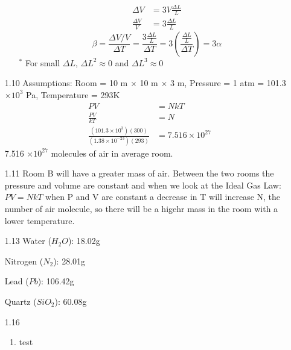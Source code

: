 \documentclass{article}
\begin{document}
\begin{enumerate}
\begin{enumerate}
\begin{align*}
                \Delta V &= 3V \frac{\Delta L}{L} \\
                \frac{\Delta V}{V} &= 3 \frac{\Delta L}{L}
            \end{align*}
            \begin{equation*}
                \beta = \frac{\Delta V / V}{\Delta T} = \frac{3 \frac{\Delta L}{L}}{\Delta T} = 3 \left(\frac{\frac{\Delta L}{L}}{\Delta T} \right) = 3 \alpha
            \end{equation*}
            \(^{\ast}\) For small \(\Delta L\), \(\Delta L^2 \approx 0\) and \(\Delta L^3 \approx 0\)
    \end{enumerate}
    \vspace{0.1in}
    \item [1.10]
    Assumptions: Room = 10 m \(\times\) 10 m \(\times\) 3 m, Pressure = 1 atm = 101.3 \(\times 10^3\) Pa, Temperature = 293\degree K
       \begin{align*}
            PV &= NkT \\
            \frac{PV}{kT} &= N \\
            \frac{(101.3 \times 10^3)(300)}{(1.38 \times 10^{-23})(293)} &= 7.516 \times 10^{27}
        \end{align*}
        7.516 \(\times 10^{27}\) molecules of air in average room.
    \vspace{0.1in}
    \item [1.11]
    Room B will have a greater mass of air. Between the two rooms the pressure and volume are constant and when we look at the Ideal Gas Law: \(PV = NkT\) when P and V are constant a decrease in T will increase N, the number of air molecule, so there will be a higehr mass in the room with a lower temperature.
    \vspace{0.1in}
    \item [1.13]
    Water (\(H_2 O\)): 18.02g

    Nitrogen (\(N_2\)): 28.01g

    Lead (\(Pb\)): 106.42g

    Quartz (\(SiO_2\)): 60.08g
    \vspace{0.1in}
    \item [1.16]
    \begin{enumerate}
        \item test
    \end{enumerate}

\end{enumerate}
\end{document}
